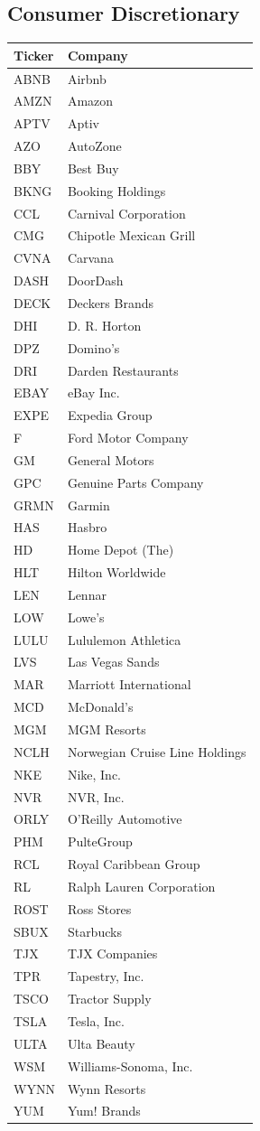 \documentclass[11pt,a4paper]{article}
\begin{document}
\subsection{Consumer Discretionary}
{\small
\begin{longtable}{lp{11cm}}
\hline
Ticker & Company \\
\hline
\endhead
ABNB & Airbnb \\
AMZN & Amazon \\
APTV & Aptiv \\
AZO & AutoZone \\
BBY & Best Buy \\
BKNG & Booking Holdings \\
CCL & Carnival Corporation \\
CMG & Chipotle Mexican Grill \\
CVNA & Carvana \\
DASH & DoorDash \\
DECK & Deckers Brands \\
DHI & D. R. Horton \\
DPZ & Domino's \\
DRI & Darden Restaurants \\
EBAY & eBay Inc. \\
EXPE & Expedia Group \\
F & Ford Motor Company \\
GM & General Motors \\
GPC & Genuine Parts Company \\
GRMN & Garmin \\
HAS & Hasbro \\
HD & Home Depot (The) \\
HLT & Hilton Worldwide \\
LEN & Lennar \\
LOW & Lowe's \\
LULU & Lululemon Athletica \\
LVS & Las Vegas Sands \\
MAR & Marriott International \\
MCD & McDonald's \\
MGM & MGM Resorts \\
NCLH & Norwegian Cruise Line Holdings \\
NKE & Nike, Inc. \\
NVR & NVR, Inc. \\
ORLY & O'Reilly Automotive \\
PHM & PulteGroup \\
RCL & Royal Caribbean Group \\
RL & Ralph Lauren Corporation \\
ROST & Ross Stores \\
SBUX & Starbucks \\
TJX & TJX Companies \\
TPR & Tapestry, Inc. \\
TSCO & Tractor Supply \\
TSLA & Tesla, Inc. \\
ULTA & Ulta Beauty \\
WSM & Williams-Sonoma, Inc. \\
WYNN & Wynn Resorts \\
YUM & Yum! Brands \\
\hline
\end{longtable}}
\end{document}
